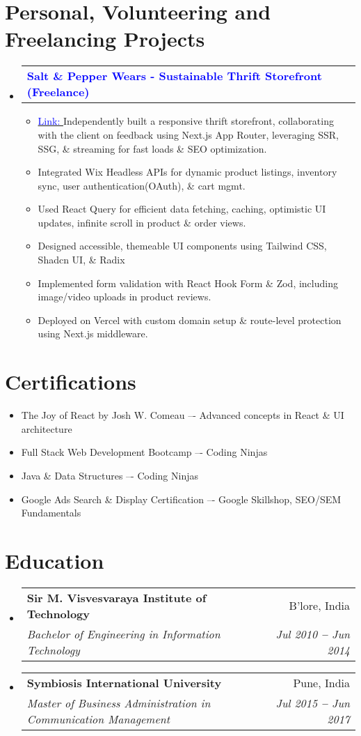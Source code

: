 \documentclass[letterpaper,11pt]{article}
\makeatletter
\newcommand{\resumeItem}[1]{
  \item\footnotesize{
    {#1 \vspace{-2pt}}
  }
}
\newcommand{\resumeSubheading}[4]{
  \vspace{-2pt}\item
    \begin{tabular*}{0.97\textwidth}[t]{l@{\extracolsep{\fill}}r}
      \small\textbf{#1} & \footnotesize #2 \\
      \textit{\footnotesize#3} & \textit{\footnotesize #4} \\
    \end{tabular*}\vspace{-6pt}
}
\newcommand{\resumeProjectHeading}[2]{
    \vspace{-2pt}\item
    \begin{tabular*}{0.97\textwidth}{l@{\extracolsep{\fill}}r}
      \small#1 & #2 \\
    \end{tabular*}\vspace{-7pt}
}
\newcommand{\resumeSubHeadingListStart}{\begin{itemize}[leftmargin=0.15in, label={}]}
\newcommand{\resumeSubHeadingListEnd}{\end{itemize}}
\newcommand{\resumeItemListStart}{\begin{itemize}}
\newcommand{\resumeItemListEnd}{\end{itemize}\vspace{-10pt}}
\makeatother
\begin{document}

\section{Personal, Volunteering and Freelancing Projects}
\vspace{3pt}
\resumeSubHeadingListStart

\resumeProjectHeading
{\textbf{\textcolor{blue}{Salt \& Pepper Wears - Sustainable Thrift Storefront (Freelance)}}}{}

\resumeItemListStart
\resumeItem{{\href{https://saltandpepper.vercel.app/}{\textcolor{blue}{Link: }}}Independently built a responsive thrift storefront, collaborating with the client on feedback using Next.js App Router, leveraging SSR, SSG, \& streaming for fast loads \& SEO optimization.}
\resumeItem{Integrated Wix Headless APIs for dynamic product listings, inventory sync, user authentication(OAuth), \& cart mgmt.}
\resumeItem{Used React Query for efficient data fetching, caching, optimistic UI updates, infinite scroll in product \& order views.}
\resumeItem{Designed accessible, themeable UI components using Tailwind CSS, Shadcn UI, \& Radix}
\resumeItem{Implemented form validation with React Hook Form \& Zod, including image/video uploads in product reviews.}
\resumeItem{Deployed on Vercel with custom domain setup \& route-level protection using Next.js middleware.}
\resumeItemListEnd


\resumeSubHeadingListEnd



\section{Certifications}
\vspace{2pt}
\resumeSubHeadingListStart
\small{\item{
              \resumeItemListStart
              \resumeItem{The Joy of React by Josh W. Comeau –- Advanced concepts in React \& UI architecture}
              \resumeItem{Full Stack Web Development Bootcamp –- Coding Ninjas}
              \resumeItem{Java \& Data Structures –- Coding Ninjas}
              \resumeItem{Google Ads Search \& Display Certification –- Google Skillshop, SEO/SEM Fundamentals}
              \resumeItemListEnd
        }}
\resumeSubHeadingListEnd





\section{Education}
\vspace{3pt}
\resumeSubHeadingListStart
\resumeSubheading
{Sir M. Visvesvaraya Institute of Technology}{B'lore, India}
{Bachelor of  Engineering in Information Technology}{Jul 2010 \textbf{--} Jun 2014}
\resumeSubheading
{Symbiosis International University}{Pune, India}
{Master of Business Administration in Communication Management}{Jul 2015 \textbf{--} Jun 2017}
\resumeSubHeadingListEnd

\end{document}
